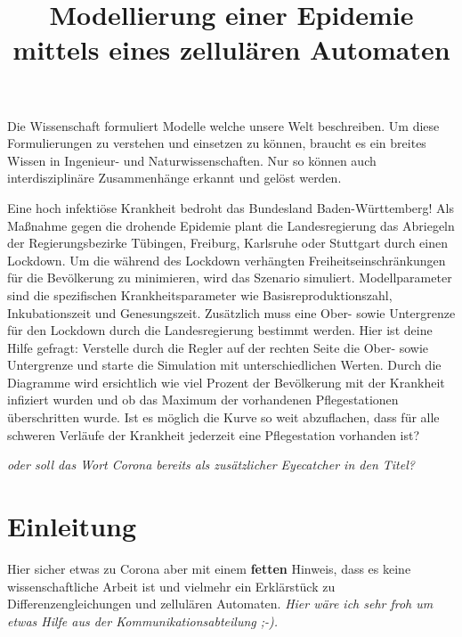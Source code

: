 \documentclass[11pt,a4paper]{article}
\title{
	Modellierung einer Epidemie mittels eines zellulären Automaten
}
\begin{document}
\maketitle

Die Wissenschaft formuliert Modelle welche unsere Welt beschreiben. Um diese Formulierungen zu verstehen und einsetzen zu können, braucht es ein breites Wissen in Ingenieur- und Naturwissenschaften. Nur so können auch interdisziplinäre Zusammenhänge erkannt und gelöst werden. 


Eine hoch infektiöse Krankheit bedroht das Bundesland Baden-Württemberg! Als Maßnahme gegen die drohende Epidemie plant die Landesregierung das Abriegeln der Regierungsbezirke Tübingen, Freiburg, Karlsruhe oder Stuttgart durch einen Lockdown. Um die während des Lockdown verhängten Freiheitseinschränkungen für die Bevölkerung zu minimieren, wird das Szenario simuliert. Modellparameter sind die spezifischen Krankheitsparameter wie Basisreproduktionszahl, Inkubationszeit und Genesungszeit. Zusätzlich muss eine Ober- sowie Untergrenze für den Lockdown durch die Landesregierung bestimmt werden. Hier ist deine Hilfe gefragt: Verstelle durch die Regler auf der rechten Seite die Ober- sowie Untergrenze und starte die Simulation mit unterschiedlichen Werten. Durch die Diagramme 	wird ersichtlich wie viel Prozent der Bevölkerung mit der Krankheit infiziert wurden und ob das Maximum der vorhandenen Pflegestationen überschritten wurde. Ist es möglich die Kurve so weit abzuflachen, dass für alle schweren Verläufe der Krankheit jederzeit eine Pflegestation vorhanden ist?


\noindent
\textit{oder soll das Wort Corona bereits als zusätzlicher Eyecatcher in den Titel?}

\section{Einleitung}
Hier sicher etwas zu Corona aber mit einem \textbf{fetten} Hinweis, dass es keine wissenschaftliche Arbeit ist und vielmehr ein Erklärstück zu Differenzengleichungen und zellulären Automaten. \textit{Hier wäre ich sehr froh um etwas Hilfe aus der Kommunikationsabteilung ;-).}
\end{document}
